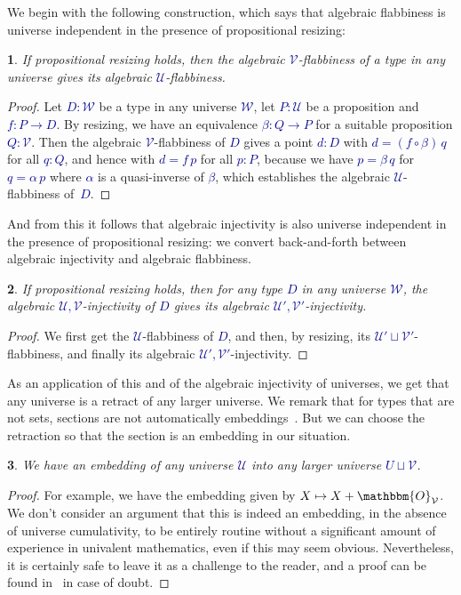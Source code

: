 \documentclass[10pt]{article}
\newcommand{\db}{\textcolor{darkblue}}
\newcommand{\m}[1]{\db{$#1$}}
\newcommand{\comp}{\mathrel{\circ}}
\newcommand{\U}{\mathcal{U}}
\newcommand{\V}{\mathcal{V}}
\newcommand{\W}{\mathcal{W}}
\newcommand{\Zero}{\mathbbm{O}}
\newtheorem{numbered}{}
\theoremstyle{definition}
\begin{document}
We begin with the following construction, which says that algebraic
flabbiness is universe independent in the presence of propositional
resizing:

\begin{numbered}
  If propositional resizing holds, then the algebraic \m{\V}-flabbiness
  of a type in any universe gives its algebraic \m{\U}-flabbiness.
\end{numbered}
\begin{proof}
  Let \m{D:\W} be a type in any universe \m{\W}, let \m{P : \U} be a
  proposition and \m{f : P \to D}. By resizing, we have an equivalence
  \m{\beta : Q \to P} for a suitable proposition \m{Q:\V}.  Then the
  algebraic \m{\V}-flabbiness of \m{D} gives a point \m{d:D} with \m{d
    = (f \comp \beta) \, q} for all \m{q : Q}, and hence with \m{d = f
    \, p} for all \m{p : P}, because we have \m{p=\beta \, q} for \m{q
    = \alpha \, p} where \m{\alpha} is a quasi-inverse of \m{\beta},
  which establishes the algebraic \m{\U}-flabbiness of~\m{D}.
\end{proof}

And from this it follows that algebraic injectivity is also universe
independent in the presence of propositional resizing: we convert
back-and-forth between algebraic injectivity and algebraic flabbiness.

\begin{numbered}
  If propositional resizing holds, then for any type \m{D} in any universe
  \m{\W}, the algebraic \m{\U,\V}-injectivity of \m{D} gives its
  algebraic \m{\U',\V'}-injectivity.
\end{numbered}
\begin{proof}
  We first get the \m{\U}-flabbiness of \m{D}, and then, by resizing, its
  \m{\U' \sqcup \V'}-flabbiness, and finally its algebraic
  \m{\U',\V'}-injectivity.
\end{proof}

As an application of this and of the algebraic injectivity of
universes, we get that any universe is a retract of any larger
universe.  We remark that for types that are not sets, sections are
not automatically embeddings~\cite{MR3548859}. But we can choose the
retraction so that the section is an embedding in our situation.

\begin{numbered}
  We have an embedding of any universe \m{\U} into any larger universe \m{U \sqcup \V}.
\end{numbered}
\begin{proof}
  For example, we have the embedding given by \m{X \mapsto X +
    \Zero_\V}. We don't consider an argument that this is indeed an
  embedding, in the absence of universe cumulativity, to be entirely
  routine without a significant amount of experience in univalent
  mathematics, even if this may seem obvious. Nevertheless, it is certainly
  safe to leave it as a challenge to the reader, and a proof can be
  found in~\cite{injective:article} in case of doubt.
\end{proof}
\end{document}

